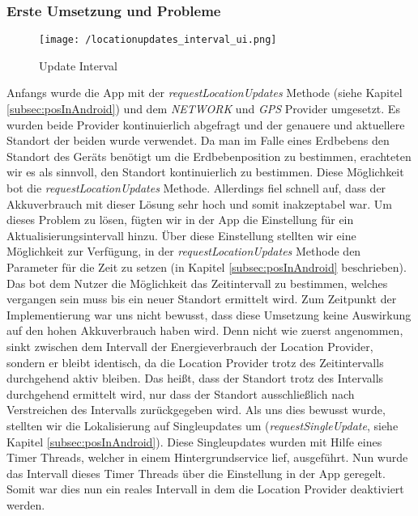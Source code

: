 \subsubsection{Erste Umsetzung und Probleme}
\begin{wrapfigure}{r}{50mm}
\centering
   \vspace{-4mm}
   \texttt{[image: /locationupdates\_interval\_ui.png]} 
   \vspace{-10mm}
   \caption[Lokalisierung: Update Interval]{Update Interval}
   \vspace{-5mm}
\end{wrapfigure}
Anfangs wurde die App mit der \textit{requestLocationUpdates} Methode (siehe Kapitel \ref{subsec:posInAndroid}) und dem \textit{NETWORK} und \textit{GPS} Provider umgesetzt. Es wurden beide Provider kontinuierlich abgefragt und der genauere
und aktuellere Standort der beiden wurde verwendet. Da man im Falle eines Erdbebens den Standort des Geräts benötigt um die Erdbebenposition zu bestimmen, erachteten wir es als sinnvoll, den Standort kontinuierlich zu bestimmen. Diese Möglichkeit bot die \textit{requestLocationUpdates} Methode. Allerdings fiel schnell auf, dass der Akkuverbrauch mit dieser Lösung sehr hoch und somit inakzeptabel war. Um dieses Problem zu lösen, fügten wir in der App die Einstellung für ein Aktualisierungsintervall hinzu. Über diese Einstellung stellten wir eine Möglichkeit zur Verfügung, in der \textit{requestLocationUpdates} Methode den Parameter für die Zeit zu setzen (in Kapitel \ref{subsec:posInAndroid} beschrieben). Das bot dem Nutzer die Möglichkeit das Zeitintervall zu bestimmen, welches vergangen sein muss bis ein neuer Standort ermittelt wird. Zum Zeitpunkt der Implementierung war uns nicht bewusst, dass diese Umsetzung keine Auswirkung auf den hohen Akkuverbrauch haben wird. Denn nicht wie zuerst angenommen, sinkt zwischen dem Intervall der Energieverbrauch der Location Provider, sondern er bleibt identisch, da die Location Provider trotz des Zeitintervalls durchgehend aktiv bleiben.
Das heißt, dass der Standort trotz des Intervalls durchgehend ermittelt wird, nur dass der Standort ausschließlich nach Verstreichen des Intervalls zurückgegeben wird.
Als uns dies bewusst wurde, stellten wir die Lokalisierung auf Singleupdates um (\textit{requestSingleUpdate}, siehe Kapitel \ref{subsec:posInAndroid}). Diese Singleupdates wurden mit Hilfe eines Timer Threads, welcher in einem Hintergrundservice lief, ausgeführt. Nun wurde das Intervall dieses Timer Threads über die Einstellung in der App geregelt. Somit war dies nun ein reales Intervall in dem die Location Provider deaktiviert werden. 
